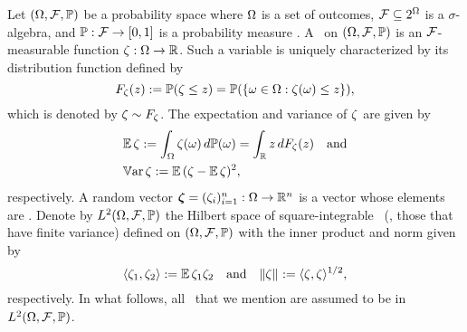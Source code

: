 Let $(\Omega, \mathcal{F}, \mathbb{P})$ be a probability space where $\Omega$ is a set of
outcomes, $\mathcal{F} \subseteq 2^\Omega$ is a $\sigma$-algebra, and
$\mathbb{P}: \mathcal{F} \to [0, 1]$ is a probability measure
\cite{durrett2010}. A \rv\ on $(\Omega, \mathcal{F}, \mathbb{P})$ is an
$\mathcal{F}$-measurable function $\zeta: \Omega \to \mathbb{R}$. Such a variable
is uniquely characterized by its distribution function defined by
\begin{equation*}
  F_\zeta(z) := \mathbb{P}(\zeta \leq z) = \mathbb{P}(\{ \omega \in \Omega: \zeta(\omega) \leq z \}),
\end{equation*}
which is denoted by $\zeta \sim F_\zeta$. The expectation and variance of
$\zeta$ are given by
\begin{align*}
  & \mathbb{E} \, \zeta := \int_\Omega \zeta(\omega) \, d\mathbb{P}(\omega) = \int_{\mathbb{R}} z \, d F_\zeta(z) \hspace{1em} \text{and} \\
  & \mathbb{V}\text{ar} \, \zeta := \mathbb{E} \, (\zeta - \mathbb{E} \, \zeta)^2,
\end{align*}
respectively. A random vector $\bm{\zeta} = (\zeta_i)_{i = 1}^n: \Omega \to \mathbb{R}^n$ is
a vector whose elements are \rvs. Denote by $L^{2}(\Omega, \mathcal{F}, \mathbb{P})$ the Hilbert
space of square-integrable \rvs\ (\ie, those that have finite variance) defined
on $(\Omega, \mathcal{F}, \mathbb{P})$ with the inner product and norm given by
\begin{equation*}
  \langle \zeta_1, \zeta_2 \rangle := \mathbb{E} \, \zeta_1 \zeta_2 \hspace{1em} \text{and} \hspace{1em} \| \zeta \|_{} := \langle \zeta, \zeta \rangle^{1/2},
\end{equation*}
respectively. In what follows, all \rvs\ that we mention are assumed to be in
$L^{2}(\Omega, \mathcal{F}, \mathbb{P})$.

